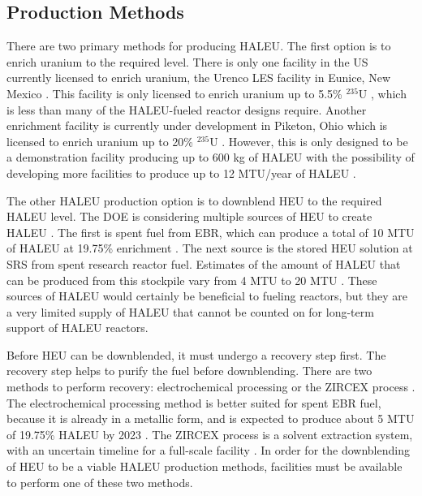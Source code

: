 \subsection{Production Methods}
There are two primary methods for producing \gls{HALEU}. The first 
option is to enrich uranium to the required level. There is only one 
facility in the US currently 
licensed to enrich uranium, the Urenco LES facility in Eunice, 
New Mexico \cite{nuclear_energy_institute_establishing_2022}. This facility is only 
licensed to enrich uranium up to 5.5\% $^{235}$U 
\cite{nuclear_energy_institute_establishing_2022},
which is less than many of the \gls{HALEU}-fueled reactor designs 
require. Another enrichment facility is currently under development in 
Piketon, Ohio which is licensed to enrich uranium up to 20\% 
$^{235}$U \cite{nuclear_energy_institute_establishing_2022}. However, this is only 
designed to be a demonstration facility producing up to 600 kg of 
\gls{HALEU} \cite{us_nuclear_regulatory_commission_centrus_2021} 
with the possibility of 
developing more facilities to produce up to 12 MTU/year of \gls{HALEU}
\cite{nuclear_energy_institute_establishing_2022}.

The other \gls{HALEU} production option is to downblend \gls{HEU} to 
the required \gls{HALEU}
level. The \gls{DOE} is considering multiple sources of \gls{HEU} 
to create \gls{HALEU} \cite{nuclear_energy_institute_establishing_2022}. The 
first is spent fuel from \gls{EBR}, which can produce a total of 10 MTU 
of \gls{HALEU} at 19.75\% enrichment \cite{nuclear_energy_institute_establishing_2022}. 
The next source is the stored \gls{HEU} solution at \gls{SRS} from 
spent research reactor fuel. Estimates of the amount of \gls{HALEU}
that can be produced from this stockpile vary from 4 MTU 
\cite{nuclear_energy_institute_establishing_2022} to 20 MTU \cite{regalbuto_addressing_2020}.
These sources of 
\gls{HALEU} would certainly be beneficial to fueling reactors, but they 
are a very limited supply of \gls{HALEU} that cannot be counted on 
for long-term support of \gls{HALEU} reactors.

Before \gls{HEU} can be downblended, it must undergo a recovery step first. 
The recovery step helps to purify the fuel before downblending. There 
are two methods to perform recovery: electrochemical processing or 
the ZIRCEX process \cite{herczeg_high-assay_2019}. The electrochemical 
processing method is better suited for spent \gls{EBR} fuel, because it is 
already in a metallic form, and is expected to produce about 5 MTU of 
19.75\% \gls{HALEU} by 2023 \cite{herczeg_high-assay_2019}. The ZIRCEX 
process is a solvent extraction system, with an uncertain timeline 
for a full-scale facility \cite{herczeg_high-assay_2019}. In order for
the downblending of \gls{HEU} to be a viable \gls{HALEU} production 
methods, facilities must be available to perform one of these two methods. 

